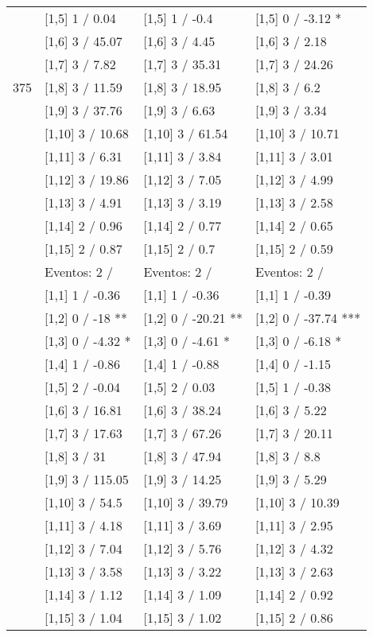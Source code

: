 \begin{table}
\begin{tabular}[t]{llll}
 & {}[1,5] 1  / 0.04 & {}[1,5] 1  / -0.4 & {}[1,5] 0  / -3.12 *\\
 & {}[1,6] 3  / 45.07 & {}[1,6] 3  / 4.45 & {}[1,6] 3  / 2.18\\
 & {}[1,7] 3  / 7.82 & {}[1,7] 3  / 35.31 & {}[1,7] 3  / 24.26\\
375 & {}[1,8] 3  / 11.59 & {}[1,8] 3  / 18.95 & {}[1,8] 3  / 6.2\\
\addlinespace
 & {}[1,9] 3  / 37.76 & {}[1,9] 3  / 6.63 & {}[1,9] 3  / 3.34\\
 & {}[1,10] 3  / 10.68 & {}[1,10] 3  / 61.54 & {}[1,10] 3  / 10.71\\
 & {}[1,11] 3  / 6.31 & {}[1,11] 3  / 3.84 & {}[1,11] 3  / 3.01\\
 & {}[1,12] 3  / 19.86 & {}[1,12] 3  / 7.05 & {}[1,12] 3  / 4.99\\
 & {}[1,13] 3  / 4.91 & {}[1,13] 3  / 3.19 & {}[1,13] 3  / 2.58\\
\addlinespace
 & {}[1,14] 2  / 0.96 & {}[1,14] 2  / 0.77 & {}[1,14] 2  / 0.65\\
 & {}[1,15] 2  / 0.87 & {}[1,15] 2  / 0.7 & {}[1,15] 2  / 0.59\\
 & Eventos:  2 / & Eventos:  2 / & Eventos:  2 /\\
 & {}[1,1] 1  / -0.36 & {}[1,1] 1  / -0.36 & {}[1,1] 1  / -0.39\\
 & {}[1,2] 0  / -18 ** & {}[1,2] 0  / -20.21 ** & {}[1,2] 0  / -37.74 ***\\
\addlinespace
 & {}[1,3] 0  / -4.32 * & {}[1,3] 0  / -4.61 * & {}[1,3] 0  / -6.18 *\\
 & {}[1,4] 1  / -0.86 & {}[1,4] 1  / -0.88 & {}[1,4] 0  / -1.15\\
 & {}[1,5] 2  / -0.04 & {}[1,5] 2  / 0.03 & {}[1,5] 1  / -0.38\\
 & {}[1,6] 3  / 16.81 & {}[1,6] 3  / 38.24 & {}[1,6] 3  / 5.22\\
 & {}[1,7] 3  / 17.63 & {}[1,7] 3  / 67.26 & {}[1,7] 3  / 20.11\\
\addlinespace
500 & {}[1,8] 3  / 31 & {}[1,8] 3  / 47.94 & {}[1,8] 3  / 8.8\\
 & {}[1,9] 3  / 115.05 & {}[1,9] 3  / 14.25 & {}[1,9] 3  / 5.29\\
 & {}[1,10] 3  / 54.5 & {}[1,10] 3  / 39.79 & {}[1,10] 3  / 10.39\\
 & {}[1,11] 3  / 4.18 & {}[1,11] 3  / 3.69 & {}[1,11] 3  / 2.95\\
 & {}[1,12] 3  / 7.04 & {}[1,12] 3  / 5.76 & {}[1,12] 3  / 4.32\\
\addlinespace
 & {}[1,13] 3  / 3.58 & {}[1,13] 3  / 3.22 & {}[1,13] 3  / 2.63\\
 & {}[1,14] 3  / 1.12 & {}[1,14] 3  / 1.09 & {}[1,14] 2  / 0.92\\
 & {}[1,15] 3  / 1.04 & {}[1,15] 3  / 1.02 & {}[1,15] 2  / 0.86\\
\bottomrule
\end{tabular}
\end{table}
